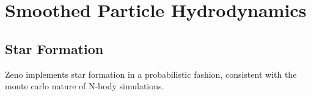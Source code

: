 \section{Smoothed Particle Hydrodynamics}
\label{sec:SPH}

\subsection{Star Formation}

Zeno implements star formation in a probabilistic fashion, consistent with the monte carlo nature of N-body simulations. 


